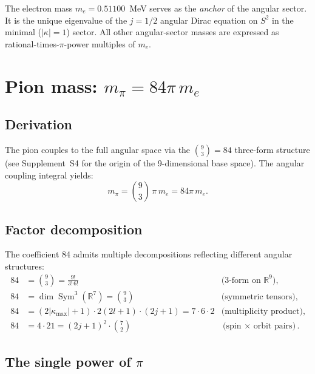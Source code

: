\documentclass[11pt,letterpaper]{article}
\numberwithin{equation}{section}
\begin{document}
The electron mass $m_e = 0.51100$~MeV serves as the \emph{anchor} of the
angular sector. It is the unique eigenvalue of the $j = 1/2$ angular Dirac
equation on $S^2$ in the minimal ($|\kappa| = 1$) sector. All other
angular-sector masses are expressed as rational-times-$\pi$-power multiples
of $m_e$.

\section{Pion mass: $m_\pi = 84\pi\,m_e$}
\label{sec:pion}

\subsection{Derivation}

The pion couples to the full angular space via the $\binom{9}{3} = 84$
three-form structure (see Supplement~S4 for the origin of the 9-dimensional
base space). The angular coupling integral yields:
\begin{equation}
\label{eq:m_pi}
\boxed{
  m_\pi = \binom{9}{3}\,\pi\,m_e = 84\pi\,m_e.
}
\end{equation}

\subsection{Factor decomposition}

The coefficient 84 admits multiple decompositions reflecting different
angular structures:
\begin{align}
  84 &= \binom{9}{3} = \frac{9!}{3!\,6!} & \text{(3-form on $\mathbb{R}^9$)}, \label{eq:84_binom}\\
  84 &= \dim\operatorname{Sym}^3(\mathbb{R}^7) = \binom{9}{3} & \text{(symmetric tensors)}, \label{eq:84_sym3}\\
  84 &= (2|\kappa_\mathrm{max}|+1) \cdot 2(2l+1) \cdot (2j+1) = 7 \cdot 6 \cdot 2 & \text{(multiplicity product)}, \label{eq:84_mult}\\
  84 &= 4 \cdot 21 = (2j+1)^2 \cdot \binom{7}{2} & \text{(spin $\times$ orbit pairs)}. \label{eq:84_spin_orbit}
\end{align}

\subsection{The single power of $\pi$}
\end{document}
